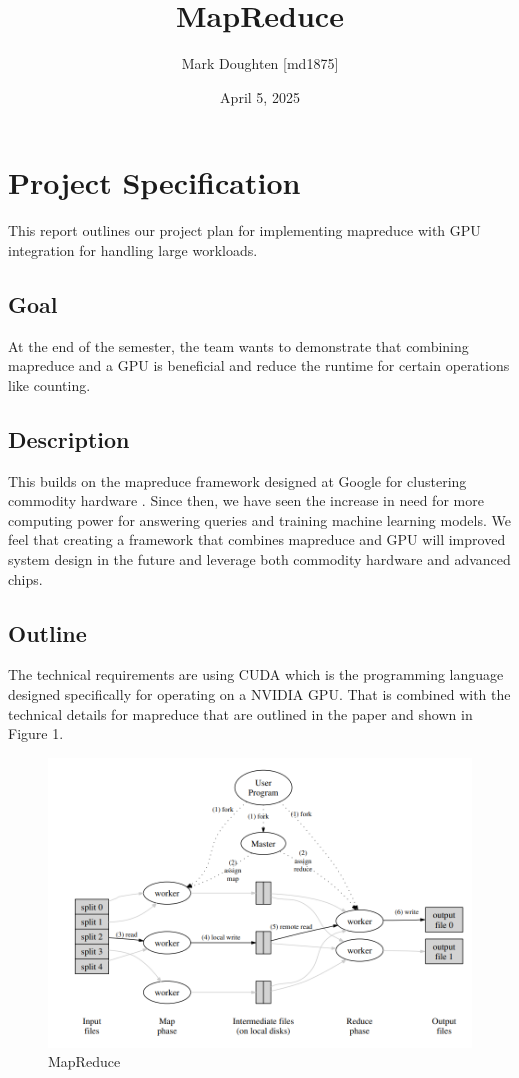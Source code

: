 \documentclass{article}
\title{MapReduce}
\author{Mark Doughten [md1875]}
\date{April 5, 2025}
\begin{document}
\maketitle
\section{Project Specification}

This report outlines our project plan for implementing mapreduce with GPU integration for handling large workloads.

\subsection{Goal}
At the end of the semester, the team wants to demonstrate that combining mapreduce and a GPU is beneficial and reduce the runtime for certain operations like counting.

\subsection{Description}
This builds on the mapreduce framework designed at Google for clustering commodity hardware \cite{mapreduce}. Since then, we have seen the increase in need for more computing power for answering queries and training machine learning models. We feel that creating a framework that combines mapreduce and GPU will improved system design in the future and leverage both commodity hardware and advanced chips. 

\subsection{Outline}
The technical requirements are using CUDA which is the programming language designed specifically for operating on a NVIDIA GPU. That is combined with the technical details for mapreduce that are outlined in the paper \cite{mapreduce} and shown in Figure 1. 

\begin{figure}[ht]
    \centering
    \includegraphics[width=1\linewidth]{./images/mapreduce.png}
    \caption{MapReduce \cite{mapreduce}}
    \label{fig:chroot}
\end{figure}
\end{document}
